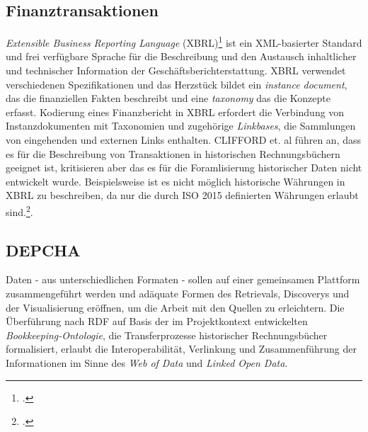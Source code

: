 \documentclass[12pt,a4paper]{article}
\begin{document}
\subsection{Finanztransaktionen}

\textit{Extensible Business Reporting Language }(XBRL)\footcite{engel2003extensible} ist ein XML-basierter Standard und frei verfügbare Sprache für die Beschreibung und den Austausch inhaltlicher und technischer Information der Geschäftsberichterstattung. XBRL verwendet verschiedenen Spezifikationen und das Herzstück bildet ein \textit{instance document}, das die finanziellen Fakten beschreibt und eine \textit{taxonomy} das die Konzepte erfasst. Kodierung eines Finanzbericht in XBRL erfordert die Verbindung von Instanzdokumenten mit Taxonomien und zugehörige \textit{Linkbases}, die Sammlungen von eingehenden und externen Links enthalten. CLIFFORD et. al führen an, dass es für die Beschreibung von Transaktionen in historischen Rechnungsbüchern geeignet ist, kritisieren aber das es für die Foramlisierung historischer Daten nicht entwickelt wurde. Beispielsweise ist es nicht möglich historische Währungen in XBRL zu beschreiben, da nur die durch ISO 2015 definierten Währungen erlaubt sind.\footcite[][S.7-9]{tomasekmedea}.

\subsection{DEPCHA}

Daten - aus unterschiedlichen Formaten - sollen auf einer gemeinsamen Plattform zusammengeführt werden und adäquate Formen des Retrievals, Discoverys und der Visualisierung eröffnen, um die Arbeit mit den Quellen zu erleichtern. Die Überführung nach RDF auf Basis der im Projektkontext entwickelten \textit{Bookkeeping-Ontologie}, die Transferprozesse historischer Rechnungsbücher formalisiert, erlaubt die Interoperabilität, Verlinkung und Zusammenführung der Informationen im Sinne des \textit{Web of Data} und \textit{Linked Open Data}.
\end{document}
